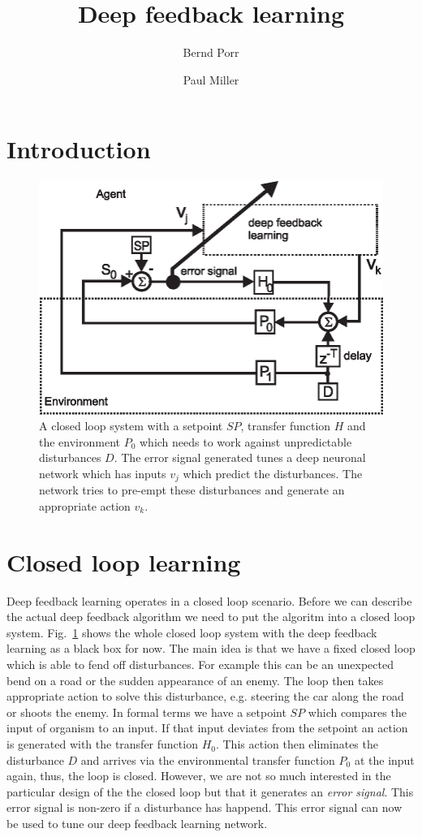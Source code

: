 \documentclass{llncs}
\title{Deep feedback learning}
\author{Bernd Porr \and Paul Miller}
\institute{Glasgow Neuro, bernd,paul@glasgowneuro.tech}
\begin{document}
\maketitle

\begin{abstract}
\end{abstract}

\section{Introduction}

\begin{figure}[h!]
  \centering
  \includegraphics[width=0.75\columnwidth]{closed_loop}
  \caption{A closed loop system with a setpoint $SP$, transfer function $H$ and the
    environment $P_0$ which needs to work against unpredictable disturbances $D$.
    The error signal generated tunes a deep neuronal network which has inputs
    $v_j$ which predict the disturbances. The network tries to pre-empt these
    disturbances and generate an appropriate action $v_k$.
    \label{closed_loop}}
\end{figure}

\section{Closed loop learning}

Deep feedback learning operates in a closed loop scenario. Before we can describe
the actual deep feedback algorithm we need to put the algoritm into a closed loop
system. Fig.~\ref{closed_loop} shows the whole closed loop system with the deep
feedback learning as a black box for now. The main idea is that we have a fixed
closed loop which is able to fend off disturbances. For example this can be
an unexpected bend on a road or the sudden appearance of an enemy. The loop then
takes appropriate action to solve this disturbance, e.g. steering the car along
the road or shoots the enemy. In formal terms we have a setpoint $SP$ which
compares the input of organism to an input. If that input deviates from the
setpoint an action is generated with the transfer function $H_0$. This action
then eliminates the disturbance $D$ and arrives via the environmental
transfer function $P_0$ at the input again, thus, the loop is closed. However,
we are not so much interested in the particular design of the the closed loop
but that it generates an \textsl{error signal}. This error signal is non-zero
if a disturbance has happend. This error signal can now be used to tune our
deep feedback learning network.
\end{document}

